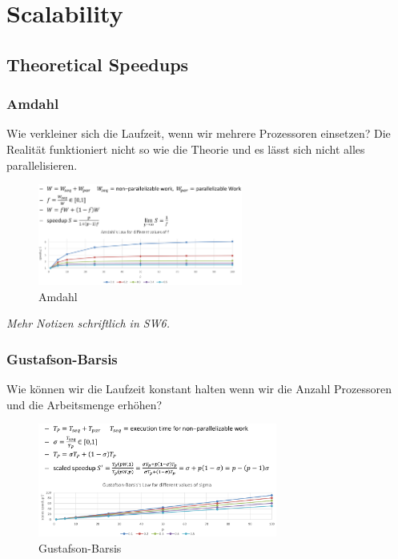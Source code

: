\hypertarget{scalability}{%
\section{Scalability}\label{scalability}}

\hypertarget{theoretical-speedups}{%
\subsection{Theoretical Speedups}\label{theoretical-speedups}}

\hypertarget{amdahl}{%
\subsubsection{Amdahl}\label{amdahl}}

Wie verkleiner sich die Laufzeit, wenn wir mehrere Prozessoren
einsetzen? Die Realität funktioniert nicht so wie die Theorie und es
lässt sich nicht alles parallelisieren.

\begin{figure}[H]
\centering
\includegraphics[width=0.6\textwidth]{figures/amdahl.png}
\caption{Amdahl}
\end{figure}

\textit{Mehr Notizen schriftlich in SW6.}

\hypertarget{gustafson-barsis}{%
\subsubsection{Gustafson-Barsis}\label{gustafson-barsis}}

Wie können wir die Laufzeit konstant halten wenn wir die Anzahl
Prozessoren und die Arbeitsmenge erhöhen?

\begin{figure}[H]
\centering
\includegraphics[width=0.7\textwidth]{figures/Gustafson-Barsis.png}
\caption{Gustafson-Barsis}
\end{figure}

